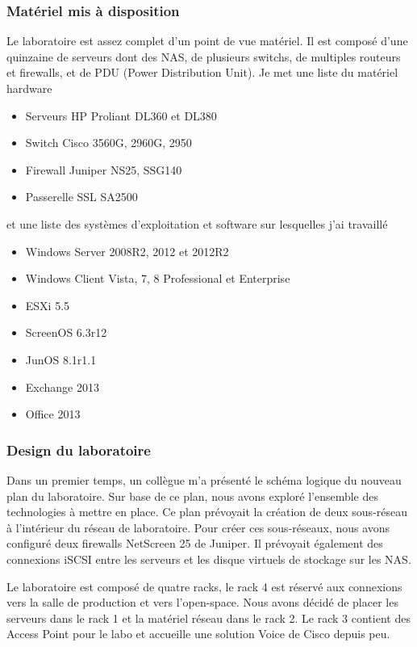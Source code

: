 \subsubsection{Matériel mis à disposition}
Le laboratoire est assez complet d'un point de vue matériel. 
Il est composé d'une quinzaine de serveurs dont des NAS, de plusieurs switchs, de multiples routeurs et firewalls, et de PDU (Power Distribution Unit).
Je met une liste du matériel hardware
\begin{itemize}
	\item Serveurs HP Proliant DL360 et DL380
	\item Switch Cisco 3560G, 2960G, 2950
	\item Firewall Juniper NS25, SSG140
	\item Passerelle SSL SA2500
\end{itemize}
et une liste des systèmes d'exploitation et software sur lesquelles j'ai travaillé
\begin{itemize}
	\item Windows Server 2008R2, 2012 et 2012R2
	\item Windows Client Vista, 7, 8 Professional et Enterprise
	\item ESXi 5.5
	\item ScreenOS 6.3r12
	\item JunOS 8.1r1.1
	\item Exchange 2013
	\item Office 2013
\end{itemize}

\subsubsection{Design du laboratoire}
Dans un premier temps, un collègue m'a présenté le schéma logique du nouveau plan du laboratoire.
Sur base de ce plan, nous avons exploré l'ensemble des technologies à mettre en place.
Ce plan prévoyait la création de deux sous-réseau à l'intérieur du réseau de laboratoire.
Pour créer ces sous-réseaux, nous avons configuré deux firewalls NetScreen 25 de Juniper. 
Il prévoyait également des connexions iSCSI entre les serveurs et les disque virtuels de stockage sur les NAS.

Le laboratoire est composé de quatre racks, le rack 4 est réservé aux connexions vers la salle de production et vers l'open-space.
Nous avons décidé de placer les serveurs dans le rack 1 et la matériel réseau dans le rack 2.
Le rack 3 contient des Access Point pour le labo et accueille une solution Voice de Cisco depuis peu.

